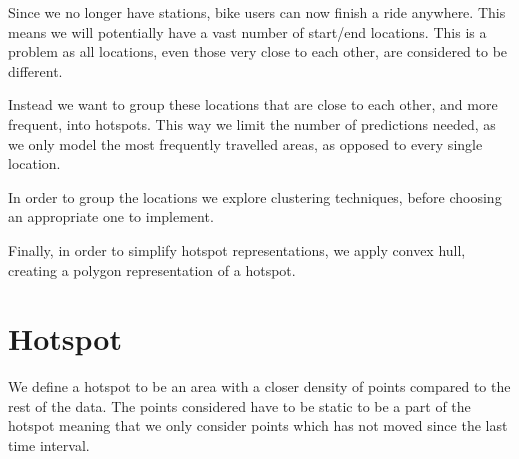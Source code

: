 Since we no longer have stations, bike users can now finish a ride anywhere.
This means we will potentially have a vast number of start/end locations.
This is a problem as all locations, even those very close to each other, are considered to be different.

Instead we want to group these locations that are close to each other, and more frequent, into hotspots.
This way we limit the number of predictions needed, as we only model the most frequently travelled areas, as opposed to every single location.

In order to group the locations we explore clustering techniques, before choosing an appropriate one to implement.

Finally, in order to simplify hotspot representations, we apply convex hull, creating a polygon representation of a hotspot.

\section{Hotspot}\label{hotspot}
We define a hotspot to be an area with a closer density of points compared to the rest of the data.
The points considered have to be static to be a part of the hotspot meaning that we only consider points which has not moved since the last time interval.